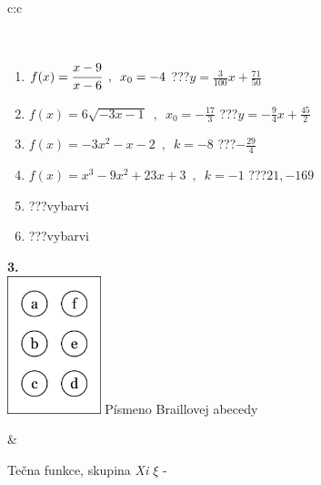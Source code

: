 \documentclass[10pt]{report}
\begin{document}
\begin{tabular}{c:c}
\begin{minipage}[c][104.5mm][t]{0.5\linewidth}
\begin{center}
\begin{minipage}{0.95\linewidth}
\begin{center}
\end{center}
\end{minipage}
\\[1mm]
\begin{minipage}{0.79\linewidth}
\begin{center}
\begin{varwidth}{\linewidth}
\begin{enumerate}
\small
\item $f(x)=\cfrac{x-9}{x-6}\enspace , \enspace x_0=-4$\quad \dotfill\; ???\;\dotfill \quad $y = \frac{3}{100}x+\frac{71}{50}$
\item $f(x)=6\sqrt{-3x-1}\enspace , \enspace x_0=-\frac{17}{3}$\quad \dotfill\; ???\;\dotfill \quad $y = -\frac{9}{4}x+\frac{45}{2}$
\item $f(x)=-3x^2-x-2\enspace , \enspace k=-8$\quad \dotfill\; ???\;\dotfill \quad $-\frac{29}{4}$
\item $f(x)=x^3-9x^2+23x+3\enspace , \enspace k=-1$\quad \dotfill\; ???\;\dotfill \quad $21 , -169$
\item \quad \dotfill\; ???\;\dotfill \quad vybarvi
\item \quad \dotfill\; ???\;\dotfill \quad vybarvi
\end{enumerate}
\end{varwidth}
\end{center}
\end{minipage}
\begin{minipage}{0.20\linewidth}
\begin{center}
{\Huge\bfseries 3.} \\[2mm]
\includegraphics[height=40mm]{../images/braille.png}
{\small Písmeno Braillovej abecedy}
\end{center}
\end{minipage}
\end{center}
\end{minipage}
&
\begin{minipage}[c][104.5mm][t]{0.5\linewidth}
\begin{center}
\vspace{7mm}
{\huge Tečna funkce, skupina \textit{Xi $\xi$} -}\\[5mm]

\end{center}
\end{minipage}
\end{tabular}
\end{document}

